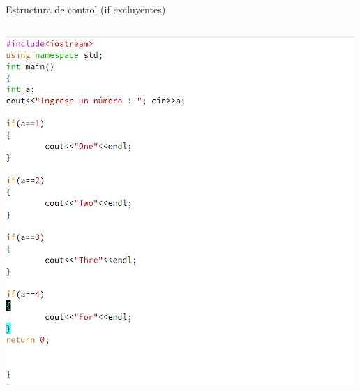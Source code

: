\documentclass[presentation, aspectratio=54]{beamer}
\begin{document}
\begin{frame}[label={sec:org5afb780}]{Estructura de control (if excluyentes)}
\begin{columns}
\begin{column}{0.6\columnwidth}
\begin{center}
\includegraphics[width=.9\linewidth]{./images/codigo/code-ifexcluyentes.png}
\end{center}
\end{column}
\end{columns}
\end{frame}
\end{document}
